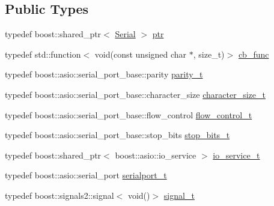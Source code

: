 \subsection*{Public Types}
\begin{DoxyCompactItemize}
\item 
typedef boost\+::shared\+\_\+ptr$<$ \hyperlink{classo_cpt_1_1protocol_1_1_serial}{Serial} $>$ \hyperlink{classo_cpt_1_1protocol_1_1_serial_a4c97c6a2456d649974e07a186f634780}{ptr}
\item 
typedef std\+::function$<$ void(const unsigned char $\ast$, size\+\_\+t)$>$ \hyperlink{classo_cpt_1_1protocol_1_1_serial_ad55591180be8bea2fe3832b1265b7496}{cb\+\_\+func}
\item 
typedef boost\+::asio\+::serial\+\_\+port\+\_\+base\+::parity \hyperlink{classo_cpt_1_1protocol_1_1_serial_aae21a39fe2f321475ca19d46bf40d5f3}{parity\+\_\+t}
\item 
typedef boost\+::asio\+::serial\+\_\+port\+\_\+base\+::character\+\_\+size \hyperlink{classo_cpt_1_1protocol_1_1_serial_a8799e83d5d812132c296dd4a6a17d6f6}{character\+\_\+size\+\_\+t}
\item 
typedef boost\+::asio\+::serial\+\_\+port\+\_\+base\+::flow\+\_\+control \hyperlink{classo_cpt_1_1protocol_1_1_serial_ad32f1d64fb16a5443d7aae92e8b14232}{flow\+\_\+control\+\_\+t}
\item 
typedef boost\+::asio\+::serial\+\_\+port\+\_\+base\+::stop\+\_\+bits \hyperlink{classo_cpt_1_1protocol_1_1_serial_aadc4c803ade35920211e6c6a202a8c1f}{stop\+\_\+bits\+\_\+t}
\item 
typedef boost\+::shared\+\_\+ptr$<$ boost\+::asio\+::io\+\_\+service $>$ \hyperlink{classo_cpt_1_1protocol_1_1_serial_ac9305799ef4be4eb50f1274184492f04}{io\+\_\+service\+\_\+t}
\item 
typedef boost\+::asio\+::serial\+\_\+port \hyperlink{classo_cpt_1_1protocol_1_1_serial_a3949fae08041279672bcb29b94d4cd52}{serialport\+\_\+t}
\item 
typedef boost\+::signals2\+::signal$<$ void()$>$ \hyperlink{classo_cpt_1_1protocol_1_1_serial_a53a2b70ff50e141214acfa50bbd232a8}{signal\+\_\+t}
\end{DoxyCompactItemize}
